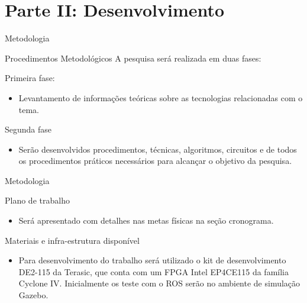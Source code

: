 \documentclass[10pt]{beamer}
\begin{document}
\section{Parte II: Desenvolvimento}

\begin{frame}{Metodologia}
    \begin{alertblock}{Procedimentos Metodológicos}
        A pesquisa será realizada em duas fases:
        \begin{block}{Primeira fase:}
            \begin{itemize}
                \item Levantamento de informações teóricas sobre as tecnologias relacionadas com o tema.
            \end{itemize}
        \end{block}
    
        \begin{block}{Segunda fase}
            \begin{itemize}
                \item Serão desenvolvidos procedimentos, técnicas, algoritmos, circuitos e de todos os procedimentos práticos necessários para alcançar o objetivo da pesquisa.
            \end{itemize}
        \end{block}
    \end{alertblock}

  
\end{frame}

{
\begin{frame}{Metodologia}
	\begin{alertblock}{Plano de trabalho}
	    \begin{itemize}
	        \item Será apresentado com detalhes nas metas físicas na seção cronograma.
	    \end{itemize}
	\end{alertblock}
	
	\begin{alertblock}{Materiais e infra-estrutura disponível}
	    \begin{itemize}
	        \item Para desenvolvimento do trabalho será utilizado o kit de desenvolvimento DE2-115
        da Terasic, que conta com um FPGA Intel EP4CE115 da família Cyclone IV. Inicialmente
        os teste com o ROS serão no ambiente de simulação Gazebo.
        \end{itemize}
	\end{alertblock}
	
\end{frame}
}
\end{document}
